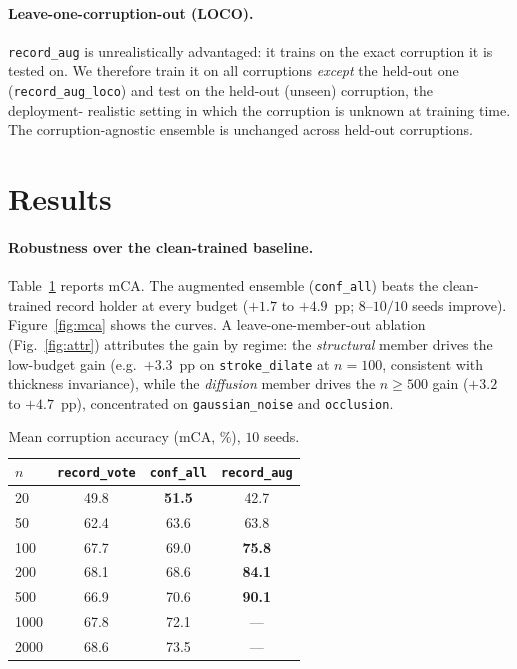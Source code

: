 \documentclass{article}
\begin{document}
\paragraph{Leave-one-corruption-out (LOCO).}
\texttt{record\_aug} is unrealistically advantaged: it trains on the exact corruption it is
tested on. We therefore train it on all corruptions \emph{except} the held-out one
(\texttt{record\_aug\_loco}) and test on the held-out (unseen) corruption, the deployment-%
realistic setting in which the corruption is unknown at training time. The
corruption-agnostic ensemble is unchanged across held-out corruptions.

\section{Results}
\paragraph{Robustness over the clean-trained baseline.}
Table~\ref{tab:mca} reports mCA. The augmented ensemble (\texttt{conf\_all}) beats the
clean-trained record holder at every budget ($+1.7$ to $+4.9$~pp; $8$--$10/10$ seeds improve).
Figure~\ref{fig:mca} shows the curves. A leave-one-member-out ablation
(Fig.~\ref{fig:attr}) attributes the gain by regime: the \emph{structural} member drives the
low-budget gain (e.g.\ $+3.3$~pp on \texttt{stroke\_dilate} at $n\!=\!100$, consistent with
thickness invariance), while the \emph{diffusion} member drives the $n\!\geq\!500$ gain
($+3.2$ to $+4.7$~pp), concentrated on \texttt{gaussian\_noise} and \texttt{occlusion}.

\begin{table}[t]
\caption{Mean corruption accuracy (mCA, \%), $10$ seeds.}
\label{tab:mca}
\centering
\begin{tabular}{@{}lccc@{}}
\toprule
$n$ & \texttt{record\_vote} & \texttt{conf\_all} & \texttt{record\_aug} \\
\midrule
20   & 49.8 & \textbf{51.5} & 42.7 \\
50   & 62.4 & 63.6 & 63.8 \\
100  & 67.7 & 69.0 & \textbf{75.8} \\
200  & 68.1 & 68.6 & \textbf{84.1} \\
500  & 66.9 & 70.6 & \textbf{90.1} \\
1000 & 67.8 & 72.1 & --- \\
2000 & 68.6 & 73.5 & --- \\
\bottomrule
\end{tabular}
\end{table}
\end{document}
